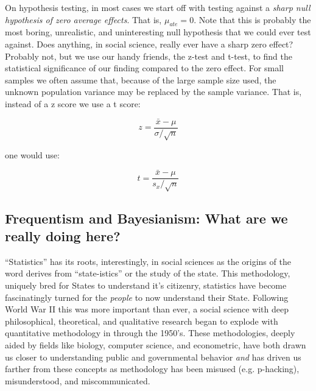 \documentclass[12pt]{article}\usepackage[]{graphicx}\usepackage[]{color}
\begin{document}
\begin{flushleft}
\newpage

\noindent On hypothesis testing, in most cases we start off with testing against a \textit{sharp null hypothesis of zero average effects}. That is, $\mu_{ate} = 0$. Note that this is probably the most boring, unrealistic, and uninteresting null hypothesis that we could ever test against. Does anything, in social science, really ever have a sharp zero effect? Probably not, but we use our handy friends, the z-test and t-test, to find the statistical significance of our finding compared to the zero effect. For small samples we often assume that, because of the large sample size used, the unknown population variance may be replaced by the sample variance. That is, instead of a z score we use a t score:

\begin{equation}
z= \frac{\bar{x} - \mu}{\sigma / \sqrt{n}}
\end{equation}

\noindent one would use:

\begin{equation}
t = \frac{\bar{x} - \mu}{s_x / \sqrt{n}}
\end{equation}





\subsection{Frequentism and Bayesianism: What are we really doing here?}

``Statistics'' has its roots, interestingly, in social sciences as the origins of the word derives from ``state-istics'' or the study of the state. This methodology, uniquely bred for States to understand it's citizenry, statistics have become fascinatingly turned for the \textit{people} to now understand their State. Following World War II this was more important than ever, a social science with deep philosophical, theoretical, and qualitative research began to explode with quantitative methodology in through the 1950's. These methodologies, deeply aided by fields like biology, computer science, and econometric, have both drawn us closer to understanding public and governmental behavior \textit{and} has driven us farther from these concepts as methodology has been misused (e.g. p-hacking), misunderstood, and miscommunicated.


\end{flushleft}
\end{document}
